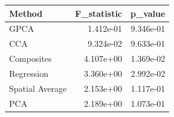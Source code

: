 \begin{tabular}{lrr}
\toprule
Method & F_statistic & p_value \\
\midrule
GPCA & 1.412e-01 & 9.346e-01 \\
CCA & 9.324e-02 & 9.633e-01 \\
Composites & 4.107e+00 & 1.369e-02 \\
Regression & 3.360e+00 & 2.992e-02 \\
Spatial Average & 2.153e+00 & 1.117e-01 \\
PCA & 2.189e+00 & 1.073e-01 \\
\bottomrule
\end{tabular}
